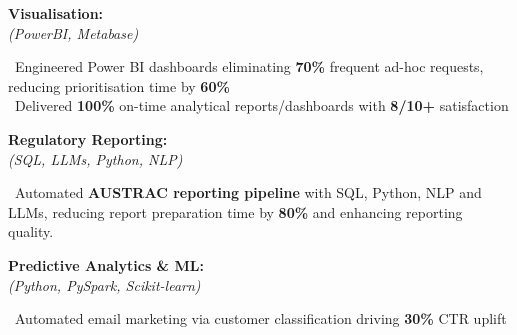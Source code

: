 \documentclass[11pt,a4paper]{article}
\begin{document}
\begin{minipage}{\textwidth}
\begin{minipage}[t]{\textwidth-19pt}
\vspace{6pt}

\noindent\begin{minipage}[t]{0.28\textwidth}
\textbf{\color{headerblue}Visualisation:}\\[0pt]
\textit{(PowerBI, Metabase)}
\end{minipage}%
\hfill%
\begin{minipage}[t]{0.68\textwidth}
\textbullet\ Engineered Power BI dashboards eliminating \textbf{70\%} frequent ad-hoc requests, reducing prioritisation time by \textbf{60\%}\\
\textbullet\ Delivered \textbf{100\%} on-time analytical reports/dashboards with \textbf{8/10+} satisfaction
\end{minipage}

\vspace{6pt}

\noindent\begin{minipage}[t]{0.28\textwidth}
\textbf{\color{headerblue}Regulatory Reporting:}\\[0pt]
\textit{(SQL, LLMs, Python, NLP)}
\end{minipage}%
\hfill%
\begin{minipage}[t]{0.68\textwidth}
\textbullet\ Automated \textbf{AUSTRAC reporting pipeline} with SQL, Python, NLP and LLMs, reducing report preparation time by \textbf{80\%} and enhancing reporting quality.
\end{minipage}

\vspace{6pt}

\noindent\begin{minipage}[t]{0.28\textwidth}
\textbf{\color{headerblue}Predictive Analytics \& ML:}\\[0pt]
\textit{(Python, PySpark, Scikit-learn)}
\end{minipage}%
\hfill%
\begin{minipage}[t]{0.68\textwidth}
\textbullet\ Automated email marketing via customer classification driving \textbf{30\%} CTR uplift
\end{minipage}

\vspace{6pt}


\end{minipage}
\end{minipage}
\end{document}
